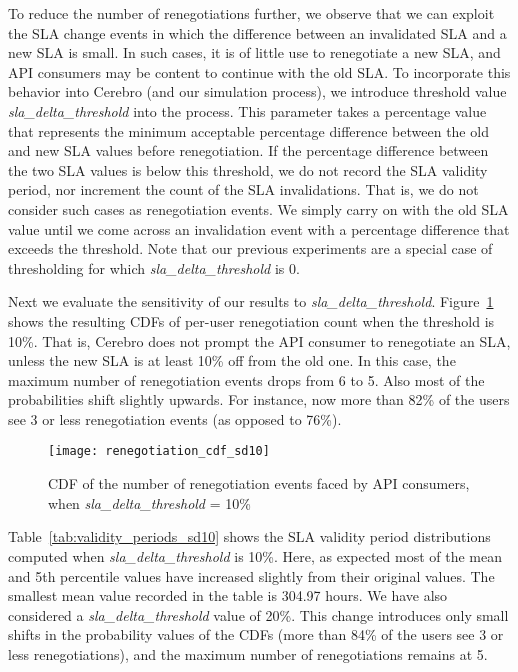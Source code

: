 To reduce the number of renegotiations further, we observe that we can exploit the
SLA change events in which the difference between an invalidated SLA
and a new SLA is small. In such cases, it is of little use to renegotiate 
a new SLA, and API consumers may be content to continue with the old SLA.
To incorporate this behavior into Cerebro (and our simulation process), we introduce threshold
value \textit{sla\_delta\_threshold} into the process. This parameter takes a percentage value that
represents the minimum acceptable percentage difference between the old and new SLA 
values before renegotiation.
If the percentage difference between the two SLA values is below this threshold, we do not record the
SLA validity period, nor increment the count of the SLA invalidations. That is, we do not consider
such cases as renegotiation events. We simply carry on with the
old SLA value until we come across an invalidation event with a percentage difference
that exceeds the threshold. 
Note that our previous experiments are 
a special case of thresholding for which \textit{sla\_delta\_threshold} is 0.

Next we evaluate the sensitivity of our results to \textit{sla\_delta\_threshold}.
Figure~\ref{fig:renegotiation_cdf_sd10}
shows the resulting CDFs of per-user renegotiation count when the threshold is 10\%. 
That is, Cerebro does not prompt the API consumer to renegotiate an SLA, unless the new SLA is at 
least 10\% off from the old one. In this case, the
maximum number of renegotiation events drops from 6 to 5.
Also most of the probabilities shift slightly upwards. For instance,
now more than 82\% of the users see 3 or less renegotiation events (as opposed to 76\%).

\begin{figure}
\centering
\texttt{[image: renegotiation\_cdf\_sd10]}
\caption{CDF of the number of renegotiation events faced by API consumers, when  \textit{sla\_delta\_threshold} = 10\%}
\label{fig:renegotiation_cdf_sd10}
\vspace{-0.1in}
\end{figure}

Table~\ref{tab:validity_periods_sd10} shows the SLA validity period distributions computed
when  \textit{sla\_delta\_threshold} is 10\%. Here, as expected  most of the mean and 5th
percentile values have increased slightly from their original values. The smallest mean value
recorded in the table is 304.97 hours. 
We have also considered a \textit{sla\_delta\_threshold} value of 20\%. This change
introduces only small shifts in the probability values of 
the CDFs (more than 84\% of the users see 3 or less renegotiations), 
and the maximum number of renegotiations remains at 5.


